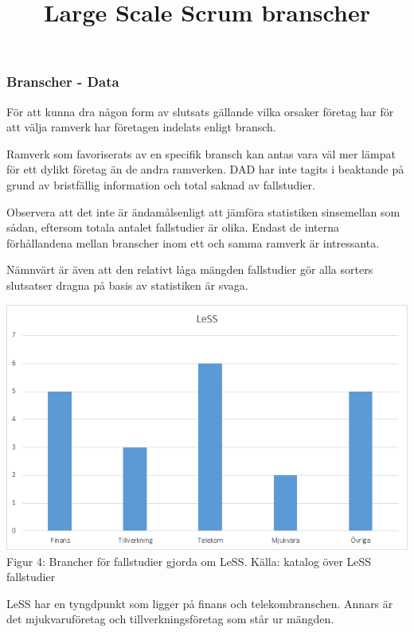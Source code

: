 			\cite{barclays_interview}
		
		\subsubsection{Branscher - Data}
			
			För att kunna dra någon form av slutsats gällande vilka orsaker företag har för att välja ramverk har företagen indelats enligt bransch.
					
			Ramverk som favoriserats av en specifik bransch kan antas vara väl mer lämpat för ett dylikt företag än de andra ramverken. DAD har inte tagits i beaktande på grund av bristfällig information och total saknad av fallstudier.
			
			Observera att det inte är ändamålsenligt att jämföra statistiken sinsemellan som sådan, eftersom totala antalet fallstudier är olika. Endast de interna förhållandena mellan branscher inom ett och samma ramverk är intressanta.
				
			Nämnvärt är även att den relativt låga mängden fallstudier gör alla sorters slutsatser dragna på basis av statistiken är svaga.
			
			\title{Large Scale Scrum branscher}
			\begin{center}
				\includegraphics{Grafer/LeSS_brancher.png}
				\\ Figur 4: Brancher för fallstudier gjorda om LeSS. Källa: katalog över LeSS fallstudier \cite{less_casestudies} 
			\end{center}
		
			LeSS har en tyngdpunkt som ligger på finans och telekombranschen. Annars är det mjukvaruföretag och tillverkningsföretag som står ur mängden.\\		
				
